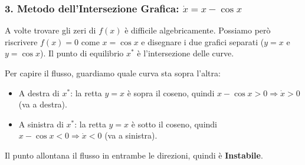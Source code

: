 \documentclass[openany]{book}
\theoremstyle{definition}
\theoremstyle{remark}
\begin{document}
\begin{center}
\end{center}

\subsubsection*{3. Metodo dell'Intersezione Grafica: $\dot{x} = x - \cos x$}
A volte trovare gli zeri di $f(x)$ è difficile algebricamente. Possiamo però riscrivere $f(x)=0$ come $x = \cos x$ e disegnare i due grafici separati ($y=x$ e $y=\cos x$).
Il punto di equilibrio $x^*$ è l'intersezione delle curve.

Per capire il flusso, guardiamo quale curva sta sopra l'altra:
\begin{itemize}
    \item A destra di $x^*$: la retta $y=x$ è sopra il coseno, quindi $x - \cos x > 0 \Rightarrow \dot{x} > 0$ (va a destra).
    \item A sinistra di $x^*$: la retta $y=x$ è sotto il coseno, quindi $x - \cos x < 0 \Rightarrow \dot{x} < 0$ (va a sinistra).
\end{itemize}
Il punto allontana il flusso in entrambe le direzioni, quindi è \textbf{Instabile}.
\end{document}
